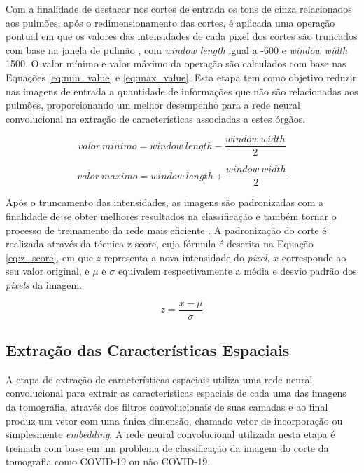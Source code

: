 Com a finalidade de destacar nos cortes de entrada os tons de cinza relacionados aos pulmões, após o redimensionamento das cortes, é aplicada uma operação pontual em que os valores das intensidades de cada pixel dos cortes são truncados com base na janela de pulmão \cite{seeram2015computed}, com \textit{window length} igual a -600 e \textit{window width} 1500. O valor mínimo e valor máximo da operação são calculados com base nas Equações \ref{eq:min_value} e \ref{eq:max_value}. Esta etapa tem como objetivo reduzir nas imagens de entrada a quantidade de informações que não são relacionadas aos pulmões, proporcionando um melhor desempenho para a rede neural convolucional na extração de características associadas a estes órgãos.

\begin{equation} \label{eq:min_value}
valor\ minimo = window\ length - \frac{window\ width}{2}
\end{equation}

\begin{equation} \label{eq:max_value}
valor\ maximo = window\ length + \frac{window\ width}{2}
\end{equation}

Após o truncamento das intensidades, as imagens são padronizadas com a finalidade de se obter melhores resultados na classificação e também tornar o processo de treinamento da rede mais eficiente \cite{sola1997importance}. A padronização do corte é realizada através da técnica z-score, cuja fórmula é descrita na Equação \ref{eq:z_score}, em que $z$ representa a nova intensidade do \textit{pixel}, $x$ corresponde ao seu valor original, e $\mu$ e $\sigma$ equivalem respectivamente a média e desvio padrão dos \textit{pixels} da imagem.

\begin{equation} \label{eq:z_score}
z = \frac{x - \mu }{\sigma}
\end{equation}

\subsection{Extração das Características Espaciais}\label{subsec:cap_metodo_carac_espaciais}

A etapa de extração de características espaciais utiliza uma rede neural convolucional para extrair as características espaciais de cada uma das imagens da tomografia, através dos filtros convolucionais de suas camadas e ao final produz um vetor com uma única dimensão, chamado vetor de incorporação ou simplesmente \textit{embedding}. A rede neural convolucional utilizada nesta etapa é treinada com base em um problema de classificação da imagem do corte da tomografia como COVID-19 ou não COVID-19. 

